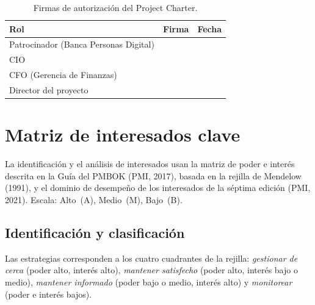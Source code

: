 \documentclass[11pt,a4paper]{article}
\renewcommand{\arraystretch}{1.35}
\begin{document}
\begin{table}[H]
\centering
\caption{Firmas de autorización del Project Charter.}
\renewcommand{\arraystretch}{2.2}
\begin{tabularx}{\textwidth}{@{}p{4.6cm} X p{2.6cm}@{}}
\toprule
\textbf{Rol} & \textbf{Firma} & \textbf{Fecha} \\
\midrule
Patrocinador (Banca Personas Digital) & & \\
CIO & & \\
CFO (Gerencia de Finanzas) & & \\
Director del proyecto & & \\
\bottomrule
\end{tabularx}
\end{table}

\clearpage
\section{Matriz de interesados clave}\label{sec:interesados}

La identificación y el análisis de interesados usan la matriz de poder e interés descrita en la Guía del PMBOK (PMI, 2017), basada en la rejilla de Mendelow (1991), y el dominio de desempeño de los interesados de la séptima edición (PMI, 2021). Escala: Alto~(A), Medio~(M), Bajo~(B).

\subsection{Identificación y clasificación}

Las estrategias corresponden a los cuatro cuadrantes de la rejilla: \textit{gestionar de cerca} (poder alto, interés alto), \textit{mantener satisfecho} (poder alto, interés bajo o medio), \textit{mantener informado} (poder bajo o medio, interés alto) y \textit{monitorear} (poder e interés bajos).
\end{document}
